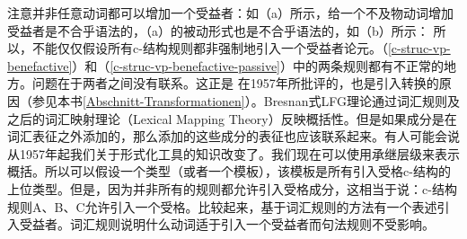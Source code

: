 \ea\label{c-struc-vp-benefactive-passive}
\z
注意并非任意动词都可以增加一个受益者：如（a）所示，给一个不及物动词增加受益者是不合乎语法的，（a）的被动形式也是不合乎语法的，如（b）所示：
\eal
{}
\zl
所以，不能仅仅假设所有c-结构规则都非强制地引入一个受益者论元。（\ref{c-struc-vp-benefactive}）和（\ref{c-struc-vp-benefactive-passive}）中的两条规则都有不正常的地方。问题在于两者之间没有联系。这正是 \citet[]{Chomsky57a}在1957年所批评的，也是引入转换的原因（参见本书\ref{Abschnitt-Transformationen}）。Bresnan式LFG理论通过词汇规则及之后的词汇映射理论（Lexical Mapping Theory）反映概括性。但是如果成分是在词汇表征之外添加的，那么添加的这些成分的表征也应该联系起来。有人可能会说从1957年起我们关于形式化工具的知识改变了。我们现在可以使用承继层级来表示概括。所以可以假设一个类型（或者一个模板），该模板是所有引入受格c-结构的上位类型。但是，因为并非所有的规则都允许引入受格成分，这相当于说：c-结构规则A、B、C允许引入一个受格。比较起来，基于词汇规则的方法有一个表述引入受益者。词汇规则说明什么动词适于引入一个受益者而句法规则不受影响。
